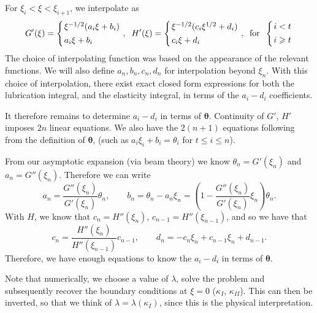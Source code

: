 \documentclass{jfm}
\begin{document}
For $\xi_i < \xi < \xi_{i+1}$, we interpolate as
\begin{equation}
\setlength{\arraycolsep}{1pt}
G'(\xi) = \left\{ \begin{array}{l}  
\xi^{-1/2}(a_i \xi + b_i) \\[4pt]
a_i \xi + b_i
 \end{array}\right., \;\;
H'(\xi) = \left\{ \begin{array}{l}  
\xi^{-1/2}(c_i \xi^{1/2} + d_i) \\[4pt]
c_i \xi + d_i
 \end{array}\right. , \;\;
\mbox{for} \;\; \left\{ \begin{array}{l}  
i<t\\[4pt]
i\geq t
\end{array}\right.
\end{equation}
The choice of interpolating function was based on the appearance of the 
relevant functions. We will also define $a_n,b_n,c_n,d_n$ for interpolation 
beyond $\xi_n$. With this choice of interpolation, there exist exact closed 
form expressions for both the lubrication integral, and the elasticity 
integral, in terms of the $a_i - d_i$ coefficients.

It therefore remains to determine $a_i -d_i$ in terms of $\boldsymbol{\theta}$.
Continuity of $G'$, $H'$ imposes $2n$ linear equations. We also have the 
$2(n+1)$ equations following from the definition of $\boldsymbol{\theta}$, 
(such as $a_i \xi_i + b_i = \theta_i$ for $t\leq i \leq n$). 

From our asymptotic expansion (via beam theory) we know $\theta_n = 
G'(\xi_n)$ and $a_n = G''(\xi_n)$. Therefore we can write
\begin{equation}
a_n = \frac{G''(\xi_n)}{G'(\xi_n)} \theta_n, \qquad
b_n  = \theta_n - a_n \xi_n = \left( 1 - \frac{G''(\xi_n)}
{G'(\xi_n)}\xi_n \right) \theta_n.
\end{equation}
With $H$, we know that $c_n = H''(\xi_n)$, $c_{n-1} = H''(\xi_{n-1})$, and
so we have that 
\begin{equation}
c_n = \frac{H''(\xi_n)}{H''(\xi_{n-1})} c_{n-1}, \qquad
d_n = -c_n \xi_n + c_{n-1}\xi_n + d_{n-1}.
\end{equation}
Therefore, we have enough equations to know the $a_i-d_i$ in terms of 
$\boldsymbol{\theta}$.

Note that numerically, we choose a value of $\lambda$, solve the problem and 
subsequently recover the boundary conditions at $\xi=0$ ($\kappa_I$, 
$\kappa_{II}$). This can then be inverted, so that we think of $\lambda = 
\lambda(\kappa_I)$, since this is the physical interpretation.
\end{document}
